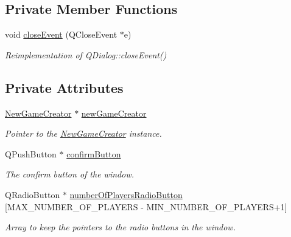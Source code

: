 \subsection*{Private Member Functions}
\begin{DoxyCompactItemize}
\item 
void \hyperlink{classNumberOfPlayersWindow_afefa90be1b7ddf10ac84744a7b79816d}{close\+Event} (Q\+Close\+Event $\ast$e)
\begin{DoxyCompactList}\small\item\em Reimplementation of Q\+Dialog\+::close\+Event() \end{DoxyCompactList}\end{DoxyCompactItemize}
\subsection*{Private Attributes}
\begin{DoxyCompactItemize}
\item 
\mbox{\label{classNumberOfPlayersWindow_a7a4c90e2553e4f401fde3ec81e7e3f56}} 
\hyperlink{classNewGameCreator}{New\+Game\+Creator} $\ast$ \hyperlink{classNumberOfPlayersWindow_a7a4c90e2553e4f401fde3ec81e7e3f56}{new\+Game\+Creator}
\begin{DoxyCompactList}\small\item\em Pointer to the \hyperlink{classNewGameCreator}{New\+Game\+Creator} instance. \end{DoxyCompactList}\item 
\mbox{\label{classNumberOfPlayersWindow_a56a9fa50a2568bd693ec4ac0b1c4c2a4}} 
Q\+Push\+Button $\ast$ \hyperlink{classNumberOfPlayersWindow_a56a9fa50a2568bd693ec4ac0b1c4c2a4}{confirm\+Button}
\begin{DoxyCompactList}\small\item\em The confirm button of the window. \end{DoxyCompactList}\item 
\mbox{\label{classNumberOfPlayersWindow_a2faa8f67709fa2da57936c57236be6c7}} 
Q\+Radio\+Button $\ast$ \hyperlink{classNumberOfPlayersWindow_a2faa8f67709fa2da57936c57236be6c7}{number\+Of\+Players\+Radio\+Button} \mbox{[}M\+A\+X\+\_\+\+N\+U\+M\+B\+E\+R\+\_\+\+O\+F\+\_\+\+P\+L\+A\+Y\+E\+RS -\/ M\+I\+N\+\_\+\+N\+U\+M\+B\+E\+R\+\_\+\+O\+F\+\_\+\+P\+L\+A\+Y\+E\+RS+1\mbox{]}
\begin{DoxyCompactList}\small\item\em Array to keep the pointers to the radio buttons in the window. \end{DoxyCompactList}\end{DoxyCompactItemize}


